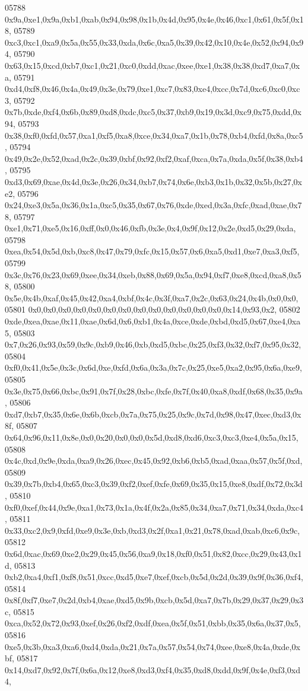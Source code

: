 \begin{DoxyCode}
05788   0x9a,0xe1,0x9a,0xb1,0xab,0x94,0x98,0x1b,0x4d,0x95,0x4e,0x46,0xc1,0x61,0x5f,0x18,
05789   0xc3,0xc1,0xa9,0x5a,0x55,0x33,0xda,0x6c,0xa5,0x39,0x42,0x10,0x4e,0x52,0x94,0x94,
05790   0x63,0x15,0xcd,0xb7,0xc1,0x21,0xc0,0xdd,0xac,0xee,0xe1,0x38,0x38,0xd7,0xa7,0xa,
05791   0xd4,0xf8,0x46,0x4a,0x49,0x3e,0x79,0xe1,0xc7,0x83,0xe4,0xcc,0x7d,0xc6,0xc0,0xc3,
05792   0x7b,0xde,0xf4,0x6b,0x89,0xd8,0xdc,0xc5,0x37,0xb9,0x19,0x3d,0xc9,0x75,0xdd,0x94,
05793   0x38,0xf0,0xfd,0x57,0xa1,0xf5,0xa8,0xce,0x34,0xa7,0x1b,0x78,0xb4,0xfd,0x8a,0xc5,
05794   0x49,0x2e,0x52,0xad,0x2c,0x39,0xbf,0x92,0xf2,0xaf,0xca,0x7a,0xda,0x5f,0x38,0xb4,
05795   0xd3,0x69,0xae,0x4d,0x3e,0x26,0x34,0xb7,0x74,0x6e,0xb3,0x1b,0x32,0x5b,0x27,0xe2,
05796   0x24,0xe3,0x5a,0x36,0x1a,0xc5,0x35,0x67,0x76,0xde,0xed,0x3a,0xfc,0xad,0xae,0x78,
05797   0xe1,0x71,0xe5,0x16,0xff,0x0,0x46,0xfb,0x3e,0x4,0x9f,0x12,0x2e,0xd5,0x29,0xda,
05798   0xea,0x54,0x5d,0xb,0xc8,0x47,0x79,0xfc,0x15,0x57,0x6,0xa5,0xd1,0xe7,0xa3,0xf5,
05799   0x3c,0x76,0x23,0x69,0xee,0x34,0xeb,0x88,0x69,0x5a,0x94,0xf7,0xe8,0xcd,0xa8,0x58,
05800   0x5e,0x4b,0xaf,0x45,0x42,0xa4,0xbf,0x4c,0x3f,0xa7,0x2c,0x63,0x24,0x4b,0x0,0x0,
05801   0x0,0x0,0x0,0x0,0x0,0x0,0x0,0x0,0x0,0x0,0x0,0x0,0x0,0x14,0x93,0x2,
05802   0xde,0xea,0xae,0x11,0xae,0x6d,0x6,0xb1,0x4a,0xce,0xde,0xbd,0xd5,0x67,0xe4,0xa5,
05803   0x7,0x26,0x93,0x59,0x9c,0xb9,0x46,0xb,0xd5,0xbc,0x25,0xf3,0x32,0xf7,0x95,0x32,
05804   0xf0,0x41,0x5e,0x3c,0x6d,0xe,0xfd,0x6a,0x3a,0x7c,0x25,0xe5,0xa2,0x95,0x6a,0xe9,
05805   0x3e,0x75,0x66,0xbc,0x91,0x7f,0x28,0xbc,0xfe,0x7f,0x40,0xa8,0xdf,0x68,0x35,0x9a,
05806   0xd7,0xb7,0x35,0x6e,0x6b,0xcb,0x7a,0x75,0x25,0x9c,0x7d,0x98,0x47,0xec,0xd3,0x8f,
05807   0x64,0x96,0x11,0x8e,0x0,0x20,0x0,0x0,0x5d,0xd8,0xd6,0xc3,0xc3,0xe4,0x5a,0x15,
05808   0x4c,0xd,0x9e,0xda,0xa9,0x26,0xec,0x45,0x92,0xb6,0xb5,0xad,0xaa,0x57,0x5f,0xd,
05809   0x39,0x7b,0xb4,0x65,0xc3,0x39,0xf2,0xef,0xfe,0x69,0x35,0x15,0xe8,0xdf,0x72,0x3d,
05810   0xf0,0xef,0x44,0x9e,0xa1,0x73,0x1a,0x4f,0x2a,0x85,0x34,0xa7,0x71,0x34,0xda,0xc4,
05811   0x33,0xc2,0x9,0xfd,0xe9,0x3e,0xb,0xd3,0x2f,0xa1,0x21,0x78,0xad,0xab,0xc6,0x9c,
05812   0x6d,0xac,0x69,0xe2,0x29,0x45,0x56,0xa9,0x18,0xf0,0x51,0x82,0xcc,0x29,0x43,0x1d,
05813   0xb2,0xa4,0xf1,0xf8,0x51,0xcc,0xd5,0xe7,0xef,0xcb,0x5d,0x2d,0x39,0x9f,0x36,0xf4,
05814   0x8f,0xf7,0xe7,0x2d,0xb4,0xae,0xd5,0x9b,0xcb,0x5d,0xa7,0x7b,0x29,0x37,0x29,0x3c,
05815   0xca,0x52,0x72,0x93,0xef,0x26,0xf2,0xdf,0xea,0x5f,0x51,0xbb,0x35,0x6a,0x37,0x5,
05816   0xe5,0x3b,0xa3,0xa6,0xd4,0xda,0x21,0x7a,0x57,0x54,0x74,0xee,0xe8,0x4a,0xde,0xbf,
05817   0x14,0xd7,0x92,0x7f,0x6a,0x12,0xe8,0xd3,0xf4,0x35,0xd8,0xdd,0x9f,0x4e,0xf3,0xd4,

\end{DoxyCode}
